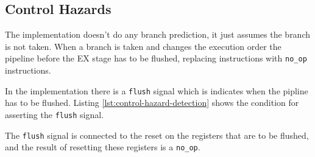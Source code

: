 
\subsection{Control Hazards}
The implementation doesn't do any branch prediction, it just assumes the branch is not taken.
When a branch is taken and changes the execution order the pipeline before the EX stage has to be flushed,
replacing instructions with \texttt{no\_op} instructions.

In the implementation there is a \texttt{flush} signal which is indicates when the pipline has to be flushed.
Listing \ref{lst:control-hazard-detection} shows the condition for asserting the \texttt{flush} signal.


The \texttt{flush} signal is connected to the reset on the registers that are to be flushed,
and the result of resetting these registers is a \texttt{no\_op}.
